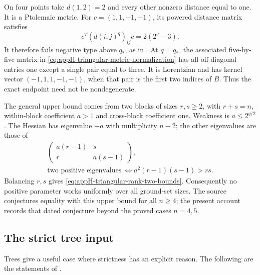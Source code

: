 \begin{example}
\label{ex:appH-triangular-five-point-boundary}
On four points take $d(1,2)=2$ and every other nonzero
distance equal to one. It is a Ptolemaic metric. For
$c=(1,1,-1,-1)$, its powered distance matrix satisfies
\begin{equation*}
 c^T(d(i,j)^q)_{ij}c=2(2^q-3).
 \tag{H.106}\label{eq:appH-triangular-Ptolemy-obstruction}
\end{equation*}
It therefore fails negative type above $q_*$, as in
\cite[Example~7.11]{BakerHuhKummerLorscheid26AnalyticV2}.
At $q=q_*$, the associated five-by-five matrix in
\eqref{eq:appH-triangular-metric-normalization} has all
off-diagonal entries one except a single pair equal to three.
It is Lorentzian and has kernel vector $(-1,1,1,-1,-1)$,
when that pair is the first two indices of $B$.
Thus the exact endpoint need not be nondegenerate.
\end{example}

The general upper bound comes from two blocks of sizes
$r,s\geq2$, with $r+s=n$, within-block coefficient $a>1$
and cross-block coefficient one. Weakness is $a\leq2^{q/2}$.
The Hessian has eigenvalue $-a$ with multiplicity $n-2$;
the other eigenvalues are those of
\begin{equation*}
 \begin{gathered}
 \begin{pmatrix}a(r-1)&s\\r&a(s-1)\end{pmatrix},\\
 \text{two positive eigenvalues}\ \Longleftrightarrow
 a^2(r-1)(s-1)>rs.
 \end{gathered}
 \tag{H.107}\label{eq:appH-triangular-two-block-obstruction}
\end{equation*}
Balancing $r,s$ gives \eqref{eq:appH-triangular-rank-two-bounds}.
Consequently no positive parameter works uniformly over all
ground-set sizes. The source conjectures equality with this
upper bound for all $n\geq4$; the present account records
that dated conjecture beyond the proved cases $n=4,5$.

\subsection{The strict tree input}
\label{sec:appH-triangular-trees}

Trees give a useful case where strictness has an explicit
reason. The following are the statements of
\cite[Theorems~A.1--A.2]{BakerHuhKummerLorscheid26AnalyticV2}.

